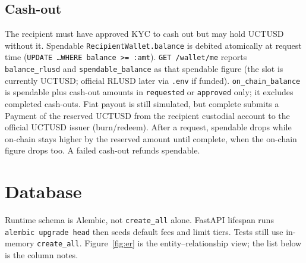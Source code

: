 \documentclass[11pt]{article}
\begin{document}
\subsection{Cash-out}
The recipient must have approved KYC to cash out but may hold UCTUSD without it. Spendable \texttt{RecipientWallet.balance} is debited atomically at request time (\texttt{UPDATE \ldots WHERE balance >= :amt}). \texttt{GET /wallet/me} reports \texttt{balance\_rlusd} and \texttt{spendable\_balance} as that spendable figure (the slot is currently UCTUSD; official RLUSD later via \texttt{.env} if funded). \texttt{on\_chain\_balance} is spendable plus cash-out amounts in \texttt{requested} or \texttt{approved} only; it excludes completed cash-outs. Fiat payout is still simulated, but complete submits a Payment of the reserved UCTUSD from the recipient custodial account to the official UCTUSD issuer (burn/redeem). After a request, spendable drops while on-chain stays higher by the reserved amount until complete, when the on-chain figure drops too. A failed cash-out refunds spendable.

\section{Database}
Runtime schema is Alembic, not \texttt{create\_all} alone. FastAPI lifespan runs \texttt{alembic upgrade head} then seeds default fees and limit tiers. Tests still use in-memory \texttt{create\_all}. Figure~\ref{fig:er} is the entity--relationship view; the list below is the column notes.
\end{document}
